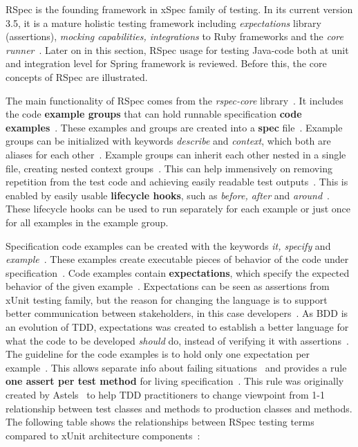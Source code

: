     RSpec is the founding framework in xSpec family of testing. In its current version 3.5, it is a mature holistic testing
    framework including \textit{expectations} library (assertions), \textit{mocking capabilities, integrations} to Ruby frameworks and the \textit{core runner}~\cite{rspecdoc}.
    Later on in this section, RSpec usage for testing Java-code both at unit and integration level for Spring framework is reviewed.
    Before this, the core concepts of RSpec are illustrated.

    The main functionality of RSpec comes from the \textit{rspec-core} library~\cite{rspecdoc}. It includes the code \textbf{example groups} that can hold runnable
    specification \textbf{code examples}~\cite{chelimsky2010rspec}. These examples and groups are created into a \textbf{spec} file~\cite{chelimsky2010rspec}.
    Example groups can be initialized with keywords \textit{describe}
    and \textit{context}, which both are aliases for each other~\cite{rspec-core}. Example groups can inherit each other nested in a single
    file, creating nested context groups~\cite{rspec-core}. This can help immensively on removing
    repetition from the test code
    and achieving easily readable test outputs~\cite{chelimsky2010rspec}. This is enabled by easily usable \textbf{lifecycle hooks},
    such as \textit{before, after} and \textit{around}~\cite{chelimsky2010rspec}.
    These lifecycle hooks can be used to run separately for each example or just once for all examples in the example group.

    Specification code examples can be created with the keywords \textit{it, specify} and \textit{example}~\cite{rspec-core}.
    These examples create executable pieces of behavior of the code under specification~\cite{chelimsky2010rspec}. Code examples
    contain \textbf{expectations}, which specify the expected behavior of the given example~\cite{chelimsky2010rspec}. Expectations can
    be seen as assertions from xUnit testing family, but the reason for changing the language is to support better communication
    between stakeholders, in this case developers~\cite{chelimsky2010rspec}. As BDD is an evolution of TDD, expectations
    was created to establish a better language for what the code to be developed \textit{should} do, instead of verifying it
    with assertions~\cite{astels2006new}. The guideline for the code examples is to hold only one expectation per example~\cite{chelimsky2010rspec}.
    This allows separate info about failing situations~\cite{chelimsky2010rspec} and provides a rule \textbf{one assert per test method}
    for living specification~\cite{astels2006new}. This rule was originally created by Astels~\cite{astels2006new} to
    help TDD practitioners to change viewpoint from 1-1 relationship between test classes and methods to production classes
    and methods.
    The following table shows the relationships between RSpec testing terms compared to xUnit architecture components~\cite{chelimsky2010rspec}:

